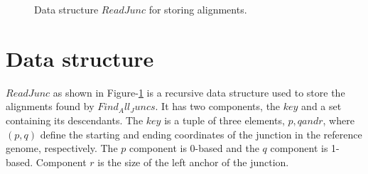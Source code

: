 \documentclass{article}
\begin{document}
\begin{figure}[h]
\begin{center}

\end{center}
\caption{Data structure $ReadJunc$ for storing alignments.}
\label{datastruct:readjuncs}
\end{figure}

\section{Data structure}
$ReadJunc$ as shown in Figure-\ref{datastruct:readjuncs} is a recursive data structure used to store the alignments found by $Find_All_Juncs$. It has two components, the $key$ and a set containing its descendants. The $key$ is a tuple of three elements, $p, q and r$, where $(p,q)$ define the starting and ending coordinates of the junction in the reference genome, respectively. The $p$ component is 0-based and the $q$ component is 1-based. Component $r$ is the size of the left anchor of the junction.
\end{document}
